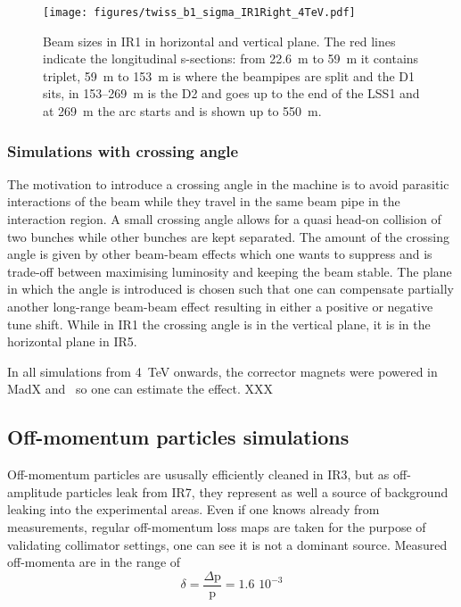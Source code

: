 \begin{figure}%
\begin{center}
  \texttt{[image: figures/twiss\_b1\_sigma\_IR1Right\_4TeV.pdf]}
\end{center}
\vspace{-0.6cm}
 \caption{Beam sizes in IR1 in horizontal and vertical plane. The red lines indicate the longitudinal s-sections: from 22.6~m to 59~m it contains triplet, 59~m to 153~m is where the beampipes are split and the D1 sits, in 153--269~m is the D2 and goes up to the end of the LSS1 and at 269~m the arc starts and is shown up to 550~m.
  \label{twissfileBS}}
\end{figure}

\subsubsection{Simulations with crossing angle}
The motivation to introduce a crossing angle in the machine is to avoid parasitic interactions of the beam while they travel in the same beam pipe in the interaction region. A small crossing angle allows for a quasi head-on collision of two bunches while other bunches are kept separated. The amount of the crossing angle is given by other beam-beam effects which one wants to suppress and is trade-off between maximising luminosity and keeping the beam stable. The plane in which the angle is introduced is chosen such that one can compensate partially another long-range beam-beam effect resulting in either a positive or negative tune shift. While in IR1 the crossing angle is in the vertical plane, it is in the horizontal plane in IR5.

In all simulations from 4~TeV onwards, the corrector magnets were powered in MadX and \fluka~so one can estimate the effect. XXX
\subsection{Off-momentum particles simulations}
Off-momentum particles are ususally efficiently cleaned in IR3, but as off-amplitude particles leak from IR7, they represent as well a source of background leaking into the experimental areas. Even if one knows already from measurements, regular off-momentum loss maps are taken for the purpose of validating collimator settings, one can see it is not a dominant source. Measured off-momenta are in the range of
\begin{equation}
  \delta = \frac{\Delta \mathrm{p}}{\mathrm{p}} = 1.6 \, \,10^{-3}
\end{equation}

